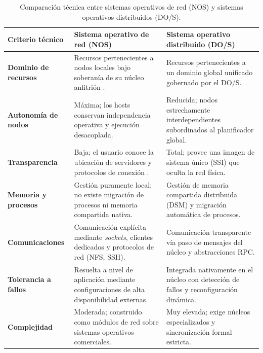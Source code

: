 \documentclass[12pt]{article}
\begin{document}
\begin{table}[H]
\centering
\small
\renewcommand{\arraystretch}{1.15}
\renewcommand{\tabularxcolumn}[1]{m{#1}}
\setlength{\emergencystretch}{1.5em}
\caption{Comparación técnica entre sistemas operativos de red (NOS) y sistemas operativos distribuidos (DO/S).}
\label{tab:comparativaNosDos}
\begin{tabularx}{\textwidth}{>{\centering\arraybackslash}m{3.1cm} X X}
\toprule
\textbf{Criterio técnico} & \textbf{Sistema operativo de red (NOS)} & \textbf{Sistema operativo distribuido (DO/S)} \\
\midrule
\textbf{Dominio de recursos} & Recursos pertenecientes a nodos locales bajo soberanía de su núcleo anfitrión \parencite[\S 10, p.\ 320]{mchoes2011sistemas}. & Recursos pertenecientes a un dominio global unificado gobernado por el DO/S. \\
\addlinespace
\textbf{Autonomía de nodos} & Máxima; los hosts conservan independencia operativa y ejecución desacoplada. & Reducida; nodos estrechamente interdependientes subordinados al planificador global. \\
\addlinespace
\textbf{Transparencia} & Baja; el usuario conoce la ubicación de servidores y protocolos de conexión \parencite[\S 17.2, p.\ 787]{deitel2004operating}. & Total; provee una imagen de sistema único (SSI) que oculta la red física. \\
\addlinespace
\textbf{Memoria y procesos} & Gestión puramente local; no existe migración de procesos ni memoria compartida nativa. & Gestión de memoria compartida distribuida (DSM) y migración automática de procesos. \\
\addlinespace
\textbf{Comunicaciones} & Comunicación explícita mediante \textit{sockets}, clientes dedicados y protocolos de red (NFS, SSH). & Comunicación transparente vía paso de mensajes del núcleo y abstracciones RPC. \\
\addlinespace
\textbf{Tolerancia a fallos} & Resuelta a nivel de aplicación mediante configuraciones de alta disponibilidad externas. & Integrada nativamente en el núcleo con detección de fallos y reconfiguración dinámica. \\
\addlinespace
\textbf{Complejidad} & Moderada; construido como módulos de red sobre sistemas operativos comerciales. & Muy elevada; exige núcleos especializados y sincronización formal estricta. \\
\bottomrule
\end{tabularx}
\end{table}
\end{document}
